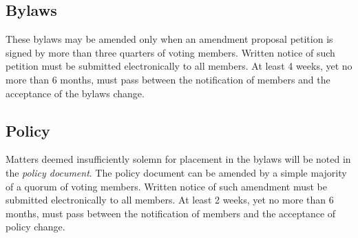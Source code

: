 \documentclass[10pt,letterpaper,titlepage]{article}
\begin{document}
\subsection{Bylaws}

These bylaws may be amended only when an amendment proposal petition is signed
by more than three quarters of voting members.  Written notice of such petition
must be submitted electronically to all members.  At least 4 weeks, yet no more
than 6 months, must pass between the notification of members and the acceptance
of the bylaws change.

\subsection{Policy}

Matters deemed insufficiently solemn for placement in the bylaws will
be noted in the \emph{policy document}.  The policy document can be
amended by a simple majority of a quorum of voting members.  Written
notice of such amendment must be submitted electronically to all
members.  At least 2 weeks, yet no more than 6 months, must pass
between the notification of members and the acceptance of policy
change.
\end{document}
